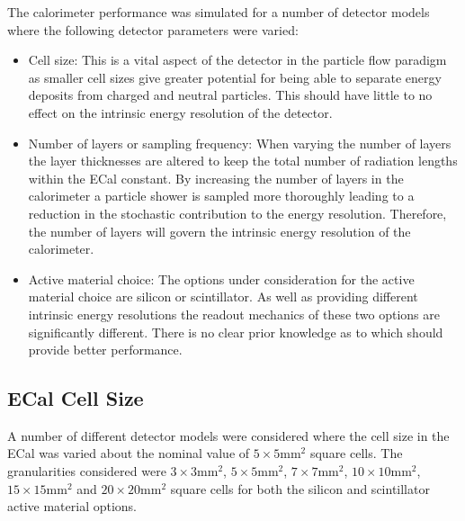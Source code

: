 The calorimeter performance was simulated for a number of detector models where the following detector parameters were varied:
\begin{itemize}
\item Cell size:  This is a vital aspect of the detector in the particle flow paradigm as smaller cell sizes give greater potential for being able to separate energy deposits from charged and neutral particles.  This should have little to no effect on the intrinsic energy resolution of the detector.  
\item Number of layers or sampling frequency:  When varying the number of layers the layer thicknesses are altered to keep the total number of radiation lengths within the ECal constant.  By increasing the number of layers in the calorimeter a particle shower is sampled more thoroughly leading to a reduction in the stochastic contribution to the energy resolution.  Therefore, the number of layers will govern the intrinsic energy resolution of the calorimeter.
\item Active material choice:  The options under consideration for the active material choice are silicon or scintillator.  As well as providing different intrinsic energy resolutions the readout mechanics of these two options are significantly different.  There is no clear prior knowledge as to which should provide better performance. 
\end{itemize}


\subsection{ECal Cell Size}
\label{sec:ecalcells}
A number of different detector models were considered where the cell size in the ECal was varied about the nominal value of $5 \times 5 \text{mm}^{2}$ square cells.  The granularities considered were $3 \times 3 \text{mm}^{2}$, $5 \times 5 \text{mm}^{2}$, $7 \times 7 \text{mm}^{2}$, $10 \times 10 \text{mm}^{2}$, $15 \times 15 \text{mm}^{2}$ and $20 \times 20 \text{mm}^{2}$ square cells for both the silicon and scintillator active material options.  

